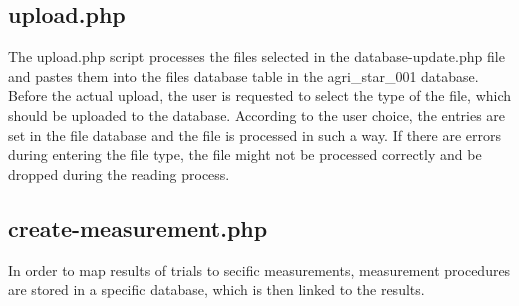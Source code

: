 \subsection{upload.php}
The upload.php script processes the files selected in the database-update.php file and pastes them into the files database table in the agri\_star\_001 database. Before the actual upload, 
the user is requested to select the type of the file, which should be uploaded to the database. According to the user choice, the entries are set in the file database and the file is processed 
in such a way. If there are errors during entering the file type, the file might not be processed correctly and be dropped during the reading process.

\subsection{create-measurement.php}
In order to map results of trials to secific measurements, measurement procedures are stored in a specific database, which is then linked to the results. 
